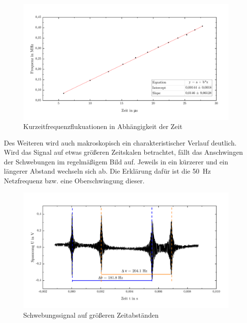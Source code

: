 \documentclass[a4paper,twoside,final]{article}
\begin{document}
\begin{figure}[htp]
    \centering
        \includegraphics[width=1\textwidth]{Bilder/Kurzzeitfluktuationen.pdf}
    \caption{Kurzeitfrequenzflukuationen in Abhängigkeit der Zeit}
      \label{fig:Schwebungssignal}
\end{figure}

Des Weiteren wird auch makroskopisch ein charakteristischer Verlauf deutlich. Wird das Signal auf etwas größeren Zeitskalen betrachtet, fällt das Anschwingen der Schwebungen im regelmäßigem Bild auf. Jeweils in ein kürzerer und ein längerer Abstand wechseln sich ab. Die Erklärung dafür ist die \SI{50}{\hertz} Netzfrequenz bzw. eine Oberschwingung dieser.

\begin{figure}[htp]
    \centering
        \includegraphics[width=1\textwidth]{Bilder/Fluktuationen_makroskopisch.pdf}
    \caption{Schwebungssignal auf größeren Zeitabständen}
    \label{fig:Schwebungssignal_makro}
\end{figure}

\newpage
\end{document}
